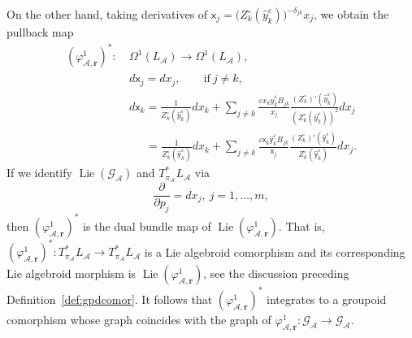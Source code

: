 \documentclass{amsart}
\numberwithin{equation}{section}
\newcommand{\bfr}{{\boldsymbol{r}}}
\newcommand{\sfx}{{\mathsf{x}}}
\newcommand{\sfy}{{\mathsf{y}}}
\newcommand{\cA}{\mathcal{A}}
\newcommand{\cG}{\mathcal{G}}
\newcommand{\Lie}{\operatorname{Lie}}
\begin{document}
On the other hand, taking derivatives of $\sfx_j = \big(Z_k^\circ(\hat{y}_k^\varepsilon)\big)^{-\delta_{jk}}x_j$,
we obtain the pullback map
\begin{align*}
	(\varphi^1_{\cA,\bfr})^*: ~& \Omega^1(L_\cA) \to \Omega^1(L_\cA), \\
	& d \sfx_j = dx_j, \qquad \text{if}~j\ne k, \\
	& d \sfx_k = \frac{1}{Z_k^\circ(\hat{y}_k^\varepsilon)} dx_k + \sum\limits_{j\ne k} \frac{\varepsilon x_k \hat{y}_k^\varepsilon B_{jk}}{x_j} \frac{(Z_k^\circ)'(\hat{y}_k^\varepsilon)}{\left(Z_k^\circ(\hat{y}_k^\varepsilon)\right)^2} dx_j \\
	& \quad \; \, = \frac{1}{Z_k^\circ(\hat{\sfy}_k^\varepsilon)} dx_k + \sum\limits_{j\ne k} \frac{\varepsilon \sfx_k \hat{\sfy}_k^\varepsilon B_{jk}}{\sfx_j} \frac{(Z_k^\circ)'(\hat{\sfy}_k^\varepsilon)}{Z_k^\circ(\hat{\sfy}_k^\varepsilon)} dx_j.
\end{align*}
If we identify $\Lie \left(\cG_\cA \right)$ and $T^*_{\pi_\cA} L_\cA$ via
\[
	\frac{\partial}{\partial p_j} = dx_j, \> j =1, \ldots, m,
\]
then $(\varphi^1_{\cA,\bfr})^*$ is the dual bundle map of $\Lie \left(\varphi^1_{\cA,\bfr} \right)$.
That is, $(\varphi^1_{\cA,\bfr})^*: T^*_{\pi_\cA} L_\cA \to T^*_{\pi_\cA} L_\cA$ is a Lie algebroid comorphism and its corresponding Lie algebroid morphism is $\Lie \left(\varphi^1_{\cA,\bfr} \right)$, see the discussion preceding Definition~\ref{def:gpdcomor}.
It follows that $(\varphi^1_{\cA,\bfr})^*$ integrates to a groupoid comorphism whose graph coincides with the graph of $\varphi^1_{\cA,\bfr}: \cG_\cA \to \cG_\cA$.
\end{document}
